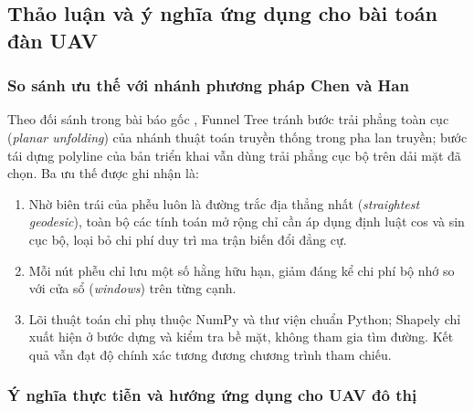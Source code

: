 \subsection{Thảo luận và ý nghĩa ứng dụng cho bài toán đàn UAV}

\subsubsection{So sánh ưu thế với nhánh phương pháp Chen và Han}

Theo đối sánh trong bài báo gốc \cite{an2024funnel}, Funnel Tree tránh bước trải
phẳng toàn cục (\emph{planar unfolding}) của nhánh thuật toán truyền thống trong
pha lan truyền; bước tái dựng polyline của bản triển khai vẫn dùng trải phẳng cục
bộ trên dải mặt đã chọn. Ba ưu thế được ghi nhận là:
\begin{enumerate}
  \item Nhờ biên trái của phễu luôn là đường trắc địa thẳng nhất (\emph{straightest
    geodesic}), toàn bộ các tính toán mở rộng chỉ cần áp dụng định luật cos và sin
    cục bộ, loại bỏ chi phí duy trì ma trận biến đổi đẳng cự.
  \item Mỗi nút phễu chỉ lưu một số hằng hữu hạn, giảm đáng kể chi phí bộ nhớ so
    với cửa sổ (\emph{windows}) trên từng cạnh.
  \item Lõi thuật toán chỉ phụ thuộc NumPy và thư viện chuẩn Python; Shapely chỉ
    xuất hiện ở bước dựng và kiểm tra bề mặt, không tham gia tìm đường. Kết quả
    vẫn đạt độ chính xác tương đương chương trình tham chiếu.
\end{enumerate}

\subsubsection{Ý nghĩa thực tiễn và hướng ứng dụng cho UAV đô thị}


